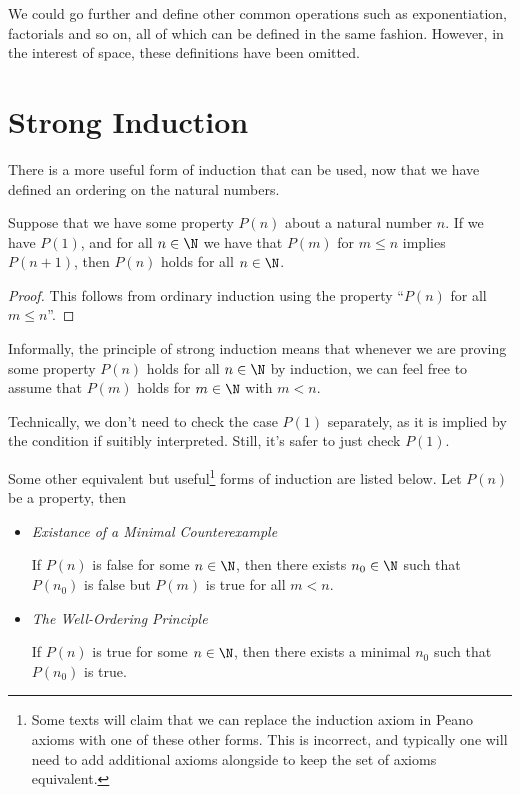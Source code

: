\documentclass[a4paper]{scrreprt}
\begin{document}
We could go further and define other common operations such as exponentiation, factorials and so on, all of which can be defined in the same fashion. However, in the interest of space, these definitions have been omitted.

\section{Strong Induction}

There is a more useful form of induction that can be used, now that we have defined an ordering on the natural numbers.

\begin{proposition}
	Suppose that we have some property $P(n)$ about a natural number $n$. If we have $P(1)$, and for all $n \in \N$ we have that $P(m)$ for $m \leq n$ implies $P(n + 1)$, then $P(n)$ holds for all $n \in \N$.
\end{proposition}
\begin{proof}
	This follows from ordinary induction using the property ``$P(n)$ for all $m \leq n$''.
\end{proof}

Informally, the principle of strong induction means that whenever we are proving some property $P(n)$ holds for all $n \in \N$ by induction, we can feel free to assume that $P(m)$ holds for $m \in \N$ with $m < n$.

\begin{remark}
	Technically, we don't need to check the case $P(1)$ separately, as it is implied by the condition if suitibly interpreted. Still, it's safer to just check $P(1)$.
\end{remark}


Some other equivalent but useful\footnote{Some texts will claim that we can replace the induction axiom in Peano axioms with one of these other forms. This is incorrect, and typically one will need to add additional axioms alongside to keep the set of axioms equivalent.} forms of induction are listed below. Let $P(n)$ be a property, then
\begin{itemize}
	\item \emph{Existance of a Minimal Counterexample}
	
	If $P(n)$ is false for some $n \in \N$, then there exists $n_0 \in \N$ such that $P(n_0)$ is false but $P(m)$ is true for all $m < n$.

	\item \emph{The Well-Ordering Principle}
	
	If $P(n)$ is true for some $n \in \N$, then there exists a minimal $n_0$ such that $P(n_0)$ is true.
\end{itemize}
\end{document}
